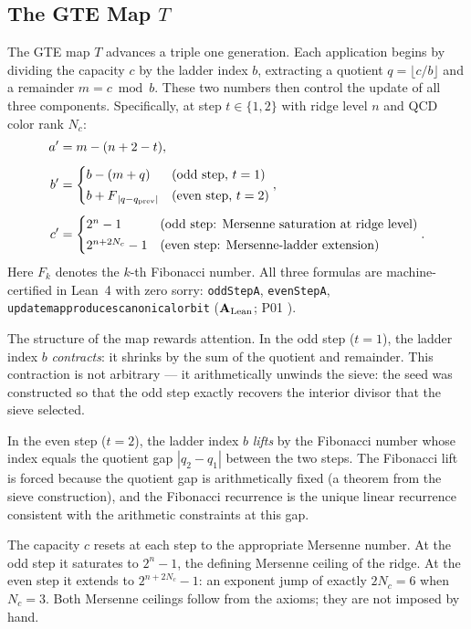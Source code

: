 \documentclass[11pt,openany]{book}
\theoremstyle{remark}
\newcommand{\lean}[1]{%
  \penalty-100
  \begingroup\def\_{\textunderscore\allowbreak}\texttt{#1}\endgroup}
\newcommand{\Nc}{N_c}
\newcommand{\CatAL}{\ensuremath{\textbf{A}_{\rm Lean}}}
\begin{document}
\subsection{The GTE Map $T$}
\label{sec:gte_map}

The GTE map $T$ advances a triple one generation.
Each application begins by dividing the capacity $c$ by the ladder index $b$,
extracting a quotient $q = \lfloor c/b \rfloor$ and a remainder $m = c \bmod b$.
These two numbers then control the update of all three components.
Specifically, at step $t \in \{1,2\}$ with ridge level $n$ and QCD color rank $\Nc$:
\begin{align}
  a' &= m - (n + 2 - t), \label{eq:gte_a_update}\\[4pt]
  b' &= \begin{cases}
    b - (m + q) & \text{(odd step, } t = 1\text{)} \\[2pt]
    b + F_{\,|q - q_{\rm prev}|} & \text{(even step, } t = 2\text{)}
  \end{cases}, \label{eq:gte_b_update}\\[4pt]
  c' &= \begin{cases}
    2^n - 1 & \text{(odd step: Mersenne saturation at ridge level)} \\[2pt]
    2^{n + 2\Nc} - 1 & \text{(even step: Mersenne-ladder extension)}
  \end{cases}. \label{eq:gte_c_update}
\end{align}
Here $F_k$ denotes the $k$-th Fibonacci number.
All three formulas are machine-certified in Lean~4 with zero sorry:
\lean{oddStepA}, \lean{evenStepA}, \lean{update\_map\_produces\_canonical\_orbit}
(\CatAL; P01 \cite{SpivackSM}).

The structure of the map rewards attention.
In the odd step ($t = 1$), the ladder index $b$ \emph{contracts}: it shrinks by the
sum of the quotient and remainder.
This contraction is not arbitrary --- it arithmetically unwinds the sieve: the seed
was constructed so that the odd step exactly recovers the interior divisor that
the sieve selected.

In the even step ($t = 2$), the ladder index $b$ \emph{lifts} by the Fibonacci number
whose index equals the quotient gap $|q_2 - q_1|$ between the two steps.
The Fibonacci lift is forced because the quotient gap is arithmetically fixed
(a theorem from the sieve construction), and the Fibonacci recurrence is the unique
linear recurrence consistent with the arithmetic constraints at this gap.

The capacity $c$ resets at each step to the appropriate Mersenne number.
At the odd step it saturates to $2^n - 1$, the defining Mersenne ceiling of the ridge.
At the even step it extends to $2^{n + 2\Nc} - 1$: an exponent jump of exactly
$2\Nc = 6$ when $\Nc = 3$.
Both Mersenne ceilings follow from the axioms; they are not imposed by hand.
\end{document}
